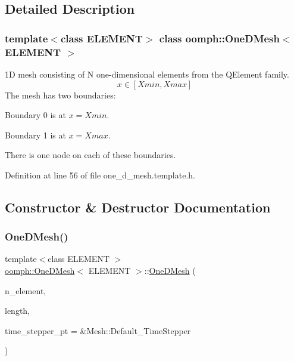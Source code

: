\subsection{Detailed Description}
\subsubsection*{template$<$class E\+L\+E\+M\+E\+NT$>$\newline
class oomph\+::\+One\+D\+Mesh$<$ E\+L\+E\+M\+E\+N\+T $>$}

1D mesh consisting of N one-\/dimensional elements from the Q\+Element family. \[ x \in [Xmin,Xmax] \] The mesh has two boundaries\+:
\begin{DoxyItemize}
\item Boundary 0 is at $x=Xmin$.
\item Boundary 1 is at $x=Xmax$.
\end{DoxyItemize}There is one node on each of these boundaries. 

Definition at line 56 of file one\+\_\+d\+\_\+mesh.\+template.\+h.



\subsection{Constructor \& Destructor Documentation}
\mbox{\label{classoomph_1_1OneDMesh_ac6962f5c0184d302544253e3b4407c48}} 
\subsubsection{\texorpdfstring{One\+D\+Mesh()}{OneDMesh()}\hspace{0.1cm}{\footnotesize\ttfamily [1/2]}}
{\footnotesize\ttfamily template$<$class E\+L\+E\+M\+E\+NT $>$ \\
\hyperlink{classoomph_1_1OneDMesh}{oomph\+::\+One\+D\+Mesh}$<$ E\+L\+E\+M\+E\+NT $>$\+::\hyperlink{classoomph_1_1OneDMesh}{One\+D\+Mesh} (\begin{DoxyParamCaption}\item[{const unsigned \&}]{n\+\_\+element,  }\item[{const double \&}]{length,  }\item[{Time\+Stepper $\ast$}]{time\+\_\+stepper\+\_\+pt = {\ttfamily \&Mesh\+:\+:Default\+\_\+TimeStepper} }\end{DoxyParamCaption})\hspace{0.3cm}{\ttfamily [inline]}}



